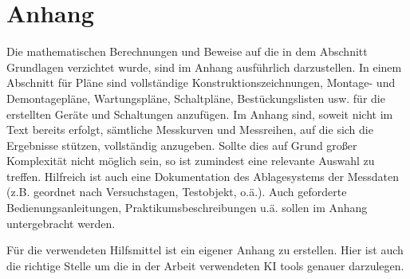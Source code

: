 \section{Anhang}

Die mathematischen Berechnungen und Beweise auf die in dem Abschnitt Grundlagen verzichtet wurde, sind im Anhang ausführlich darzustellen. In einem Abschnitt für Pläne sind vollständige Konstruktionszeichnungen, Montage- und Demontagepläne, Wartungspläne, Schaltpläne,
Bestückungslisten usw. für die erstellten Geräte und Schaltungen anzufügen. Im Anhang sind, soweit nicht im Text bereits erfolgt, sämtliche Messkurven und Messreihen, auf die sich die Ergebnisse stützen, vollständig anzugeben. Sollte dies auf Grund großer Komplexität nicht möglich sein, so ist zumindest eine relevante Auswahl zu treffen. Hilfreich ist auch eine Dokumentation des Ablagesystems der Messdaten (z.B. geordnet nach Versuchstagen, Testobjekt, o.ä.). Auch geforderte Bedienungsanleitungen, Praktikumsbeschreibungen u.ä. sollen im Anhang untergebracht werden.

Für die verwendeten Hilfsmittel ist ein eigener Anhang zu erstellen. Hier ist auch die richtige Stelle um die in der Arbeit verwendeten KI tools genauer darzulegen.







